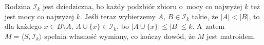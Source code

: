 
\exercise %
Rodzina $\mathcal{I}_k$ jest dziedziczna, bo każdy podzbiór zbioru o~mocy co najwyżej $k$ też jest mocy co najwyżej $k$.
Jeśli teraz wybierzemy $A$, $B\in\mathcal{I}_k$ takie, że $|A|<|B|$, to dla każdego $x\in B\setminus A$, $A\cup\{x\}\in\mathcal{I}_k$, bo $|A\cup\{x\}|\le|B|\le k$.
A~zatem $M=\langle S,\mathcal{I}_k\rangle$ spełnia własność wymiany, co kończy dowód, że $M$ jest matroidem.

\exercise %
\exercise %
\exercise %
\exercise %
